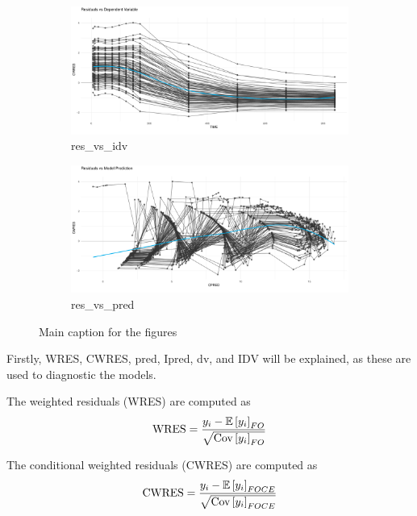 \begin{figure}
    \begin{subfigure}[b]{0.45\linewidth}
        \centering
        \includegraphics[width=\linewidth]{fig/img/Xpose/res_vs_idv.pdf}
        \caption{res\_vs\_idv}
        \label{fig:res_vs_idv}
    \end{subfigure}
    \hfill
    \begin{subfigure}[b]{0.45\linewidth}
        \centering
        \includegraphics[width=\linewidth]{fig/img/Xpose/res_vs_pred.pdf}
        \caption{res\_vs\_pred}
        \label{fig:res_vs_pred}
    \end{subfigure}

    \caption{Main caption for the figures}
    \label{fig:all_figures}
\end{figure}
Firstly, WRES, CWRES, pred, Ipred, dv, and IDV will be explained, as these are used to diagnostic the models. 

The weighted residuals (WRES) are computed as
\begin{align*}
    \text{WRES} = \frac{y_i - \mathbb{E}\left[{y_i}\right]_{FO}}{\sqrt{\text{Cov}\left[{y_i}\right]_{FO}}}
\end{align*}

The conditional weighted residuals (CWRES) are computed as
\begin{align*}
    \text{CWRES} = \frac{y_i - \mathbb{E}\left[{y_i}\right]_{FOCE}}{\sqrt{\text{Cov}\left[{y_i}\right]_{FOCE}}}
\end{align*}










